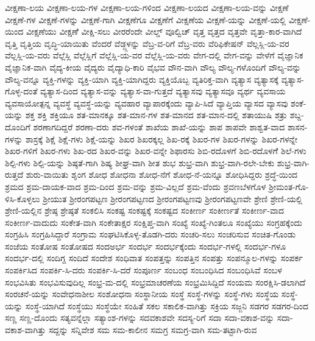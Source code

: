 {ವೀಕ್ಷಣಾ-ಲಯ
ವೀಕ್ಷಣಾ-ಲಯ-ಗಳ
ವೀಕ್ಷಣಾ-ಲಯ-ಗಳಿಂದ
ವೀಕ್ಷಣಾ-ಲಯದ
ವೀಕ್ಷಣಾ-ಲಯ-ವನ್ನು
ವೀಕ್ಷಣೆ
ವೀಕ್ಷಣೆ-ಗಳ
ವೀಕ್ಷಣೆ-ಗಳನ್ನು
ವೀಕ್ಷಣೆ-ಗಾಗಿ
ವೀಕ್ಷಣೆಗೂ
ವೀಕ್ಷಣೆಗೆ
ವೀಕ್ಷಣೆಯ
ವೀಕ್ಷಣೆ-ಯನ್ನು
ವೀಕ್ಷಣೆ-ಯಲ್ಲಿ
ವೀಕ್ಷಣೆ-ಯಿಂದ
ವೀಕ್ಷಣೆಯು
ವೀಕ್ಷಣೆೆ
ವೀಕ್ಷಿ-ಸಲು
ವೀರರೆಂದೇ
ವೀಲ್ಡ್
ವೂಲ್ವಿಚ್
ವೃತ್ತ
ವೃತ್ತದ
ವೃತ್ತವೇ
ವೃತ್ತಾ-ಕಾರ-ವಾಗಿದೆ
ವೃತ್ತಿ
ವೃತ್ತಿಯ
ವೃದ್ಧಿ-ಯಾಯಿತು
ವೆಂದರೆ
ವೆಡ್ಜ್ಗಳನ್ನು
ವೆಬ್ರ-ವ-ರಿಗೆ
ವೆಬ್ರ-ವರು
ವೆರಿಫಿಕೇಷನ್
ವೆಲ್ಲಸ್ಲಿ-ಯ-ವರ
ವೆಲ್ಲಸ್ಲಿ-ಯ-ವರು
ವೆಲ್ಲೆಸ್ಲಿ
ವೆಲ್ಲೆಸ್ಲಿಗೆ
ವೆಲ್ಲೆಸ್ಲಿ-ಯ-ವರ
ವೆಲ್ಲೆಸ್ಲಿ-ಯ-ವರು
ವೇಗ-ದಲ್ಲಿ
ವೇಗ-ವನ್ನು
ವೇಳೆಗೆ
ವೈಜ್ಞಾನಿಕ
ವೈಜ್ಞಾನಿಕ-ವಾಗಿ
ವೈದ್ಯ-ಕೀಯ
ವೈದ್ಯರು
ವೈದ್ಯಾಧಿ-ಕಾರಿ
ವೈಭವ
ವೌನ-ವಾಗಿ
ವೌಲ್ಯ
ವೌಲ್ಯ-ಗಳೊಂದಿಗೆ
ವೌಲ್ಯ-ವನ್ನು
ವೌಲ್ಯ-ವನ್ನೂ
ವ್ಯಕ್ತಿ-ಗಳನ್ನು
ವ್ಯಕ್ತಿ-ಯಾಗಿ
ವ್ಯಕ್ತಿ-ಯಾಗಿದ್ದರು
ವ್ಯಕ್ತಿಯೊಬ್ಬ
ವ್ಯತಿರಿಕ್ತ-ವಾಗಿ
ವ್ಯತ್ಯಾಸ
ವ್ಯತ್ಯಾಸಕ್ಕೆ
ವ್ಯತ್ಯಾಸ-ಗೊಳ್ಳ-ದಂತೆ
ವ್ಯತ್ಯಾಸ-ದಿಂದ
ವ್ಯತ್ಯಾಸ-ವನ್ನು
ವ್ಯತ್ಯಾಸ-ವಾ-ಗುತ್ತದೆ
ವ್ಯತ್ಯಾಸವು
ವ್ಯತ್ಯಾಸವೂ
ವ್ಯರ್ಥ
ವ್ಯವಸಾಯ
ವ್ಯವಸಾಯೋತ್ಪನ್ನ
ವ್ಯವಸ್ಥೆ
ವ್ಯವಸ್ಥೆ-ಯನ್ನು
ವ್ಯವಹಾರ
ವ್ಯಾಪಾರಕ್ಕೆಂದು
ವ್ಯಾಪಿ-ಸಿದೆ
ವ್ಯಾಪ್ತಿಯ
ವ್ಯಾಸದ
ವ್ಯಾಸವು
ಶಂಕೆ-ಯನ್ನು
ಶಕ್ತ
ಶಕ್ತಿ
ಶಕ್ತಿಯೂ
ಶತ-ಮಾನಕ್ಕೂ
ಶತ-ಮಾನ-ಗಳ
ಶತ-ಮಾನದ
ಶತ-ಮಾನ-ದಲ್ಲಿ
ಶತಾಯುಷಿ
ಶತ್ರು
ಶಬ್ದ-ದೊಂದಿಗೆ
ಶರಣಾಗದಿದ್ದರೆ
ಶರಣಾ-ದರು
ಶವ-ಗಳಂತೆ
ಶಾಖೆಯ
ಶಾಖೆ-ಯನ್ನು
ಶಾಪ
ಶಾಪವೇ
ಶಾಶ್ವತ-ವಾದ
ಶಾಸನ-ಗಳನ್ನು
ಶಾಸ್ರಕ್ಕೆ
ಶಿಕ್ಷೆ
ಶಿಕ್ಷೆ-ಗಳು
ಶಿಕ್ಷೆ-ಯನ್ನು
ಶಿಖರ
ಶಿಖರಕ್ಕಲ್ಲ
ಶಿಖ-ರಕ್ಕೆ
ಶಿಖರ-ಗಳ
ಶಿಖರ-ಗಳನ್ನು
ಶಿಖರ-ಗಳನ್ನೇ
ಶಿಖರ-ಗಳಿಗೆ
ಶಿಖರ-ಗಳು
ಶಿಖ-ರದ
ಶಿಖರ-ವನ್ನು
ಶಿಖರ-ವನ್ನೇ
ಶಿಫಾರಸು
ಶಿಬಿ-ರದೊಳಗೆ
ಶಿಬಿ-ರದೊಳಗೆೆ
ಶಿಲೆ-ಗಳು
ಶಿಲ್ಪಿ-ಗಳು
ಶಿಲ್ಪಿ-ಯನ್ನು
ಶಿಷ್ಠತೆ-ಗಾಗಿ
ಶಿಷ್ಯ
ಶೀಘ್ರ-ವಾಗಿ
ಶೀತ
ಶುಭ
ಶುಭ್ರ-ವಾಗಿ
ಶುಭ್ರ-ವಾಗಿ-ರಲೇ-ಬೇಕು
ಶುಭ್ರ-ವಾಗಿ-ರುತ್ತದೆ
ಶುರು-ವಾಯಿತು
ಶೃಂಗ
ಶೋಧ
ಶೋಧನಾ
ಶೋಧ-ನೆಗೆ
ಶೋಧ-ನೆ-ಯನ್ನೂ
ಶೋಧಿಸಿದ್ದರು
ಶ್ರದ್ಧೆ-ಯಿಂದ
ಶ್ರಮದ
ಶ್ರಮ-ದಾಯಕ-ವಾದ
ಶ್ರಮ-ದಿಂದ
ಶ್ರಮ-ವನ್ನು
ಶ್ರಮ-ವಿಲ್ಲದೆ
ಶ್ರಮ-ವೆಂದು
ಶ್ರವಣಬೆಳಗೊಳ
ಶ್ರೀಮಂತ-ಗೊ-ಳಿಸಿ-ಕೊಳ್ಳಲು
ಶ್ರೀಯುತ
ಶ್ರೀರಂಗಪಟ್ಟಣ
ಶ್ರೀರಂಗಪಟ್ಟಣದ
ಶ್ರೀರಂಗಪಟ್ಟಣವು
ಶ್ರೀರಂಗಪಟ್ಟಣವೇ
ಶ್ರೇಣಿ
ಶ್ರೇಣಿ-ಯಲ್ಲಿ
ಶ್ರೇಣಿ-ಯಲ್ಲಿನ
ಶ್ರೇಷ್ಠ
ಶ್ರೇಷ್ಠತೆ
ಸಂಕಲಿಸಿ
ಸಂಕಷ್ಟ
ಸಂಕಷ್ಟಕ್ಕೆ
ಸಂಕಷ್ಟದ
ಸಂಕೀರ್ಣ
ಸಂಕೀರ್ಣತೆ
ಸಂಕೀರ್ಣ-ವಾದ
ಸಂಕೀರ್ಣ-ವಾದುದು
ಸಂಕೇತ-ವಾಗಿ
ಸಂಕೇತಾಕ್ಷರ
ಸಂಕ್ಷಿಪ್ತ-ವಾಗಿ
ಸಂಖ್ಯೆ
ಸಂಖ್ಯೆ-ಗಿಂತಲೂ
ಸಂಖ್ಯೆಯು
ಸಂಗ್ರಹಕ್ಕೆಂದು
ಸಂಗ್ರಹಿಸಿ
ಸಂಗ್ರಹಿಸಿದ್ದಾರೆ
ಸಂಗ್ರಾಮ
ಸಂಘಟಿಸಿಕೊಳ್ಳ-ತೊಡಗಿ-ದರು
ಸಂಚರಿ-ಸಲು
ಸಂಚರಿಸುವ
ಸಂಚಿತ-ಗೊಂಡು
ಸಂಜೆಯ
ಸಂತೋಷ
ಸಂತೋಷದ
ಸಂದಅರ್ಭ
ಸಂದರ್ಭ
ಸಂದರ್ಭಕ್ಕೆಂದು
ಸಂದರ್ಭ-ಗಳಲ್ಲಿ
ಸಂದರ್ಭ-ಗಳೂ
ಸಂದರ್ಭ-ದಲ್ಲಿ
ಸಂದಿಗ್ದ
ಸಂದಿದೆ
ಸಂದೇಶ
ಸಂಧಿವಾತ
ಸಂಪತ್ತನ್ನು
ಸಂಪತ್ತಿನ
ಸಂಪತ್ತು
ಸಂಪನ್ಮೂಲ-ಗಳನ್ನು
ಸಂಪರ್ಕ
ಸಂಪರ್ಕಿಸಿದ
ಸಂಪರ್ಕಿ-ಸಿ-ದರು
ಸಂಪರ್ಕಿ-ಸಿ-ದರೆ
ಸಂಪೂರ್ಣ
ಸಂಬಂಧ
ಸಂಬಂಧಿಸಿದ
ಸಂಬಂಧಿಸಿವೆ
ಸಂಬಳ
ಸಂಭವಿಸಿತು
ಸಂಭವಿಸುವುದಿಲ್ಲ
ಸಂಭ್ರ-ಮ-ದಲ್ಲಿ
ಸಂಭ್ರಮಾಚರಣೆಯ
ಸಂಭ್ರಮಿಸಿದ್ದಿದೆ
ಸಂಯಮ
ಸಂರಕ್ಷಿಸಿ-ಡಲಾಗಿದೆ
ಸಂರಚನೆ-ಯನ್ನು
ಸಂವೇಧನಾಶೀಲ
ಸಂಶೋಧನಾ
ಸಂಸ್ಥಾನೀಯ
ಸಂಸ್ಥೆ
ಸಂಸ್ಥೆ-ಗಳನ್ನು
ಸಂಸ್ಥೆ-ಗಳು
ಸಂಸ್ಥೆಯ
ಸಂಸ್ಥೆ-ಯನ್ನು
ಸಂಸ್ಥೆ-ಯಾಗಿದೆ
ಸಂಸ್ಥೆಯು
ಸಂಸ್ಥೆಯೇ
ಸಂಹಿತೆ
ಸಕಲ
ಸಕಾಲಿಕ-ವಾಗಿತ್ತು
ಸಕ್ರಿಯ
ಸಜ್ಜನಿ
ಸಡಗರ
ಸಡಗರ-ದಿಂದ
ಸಣ್ಣ
ಸಣ್ಣ-ದೊಂದು
ಸತ್ಯವನ್ನೆಲ್ಲಾ
ಸತ್ಯಾಂಶ-ಗಳನ್ನು
ಸದವಕಾಶವೇ
ಸದಸ್ಯ-ರಿಗೆ
ಸದಾ
ಸದಾ-ವಕಾಶ-ವನ್ನು
ಸದಾ-ವಕಾಶ-ವಾಗಿತ್ತು
ಸದ್ದನ್ನು
ಸನ್ನಿವೇಶ
ಸಮ
ಸಮ-ಕಾಲೀನ
ಸಮಗ್ರ
ಸಮಗ್ರ-ವಾಗಿ
ಸಮ-ತಟ್ಟಾಗಿ-ರುವ
}
